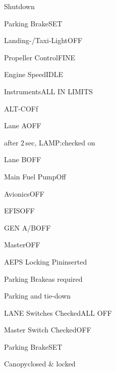 \begin{checklist}{Shutdown}
  \item{Parking Brake}{SET}
  \item{Landing-/Taxi-Light}{OFF}
  \item{Propeller Control}{FINE}
  \item{Engine Speed}{IDLE}
  \item{Instruments}{ALL IN LIMITS}
  \item{ALT-C}{OFf}
  \item{Lane A}{OFF}
  \item{after 2\,sec, LAMP:}{checked on}
  \item{Lane B}{OFF}
  \item{Main Fuel Pump}{Off}
  \item{Avionics}{OFF}
  \item{EFIS}{OFF}
  \item{GEN A/B}{OFF}
  \item{Master}{OFF}
  \item{AEPS Locking Pin}{inserted}
  \item{Parking Brake}{as required}
\end{checklist}

\begin{checklist}{Parking and tie-down}
  \item{LANE Switches Checked}{ALL OFF}
  \item{Master Switch Checked}{OFF}
  \item{Parking Brake}{SET}
  \item{Canopy}{closed \& locked}
\end{checklist}


